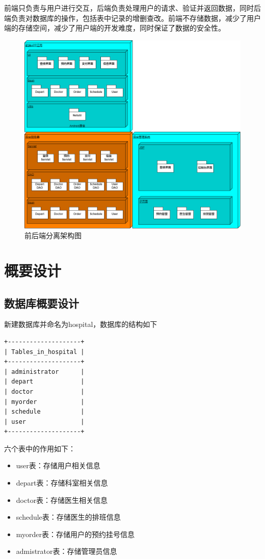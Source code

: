 \documentclass[UTF8,12pt]{article}
\begin{document}
前端只负责与用户进行交互，后端负责处理用户的请求、验证并返回数据，同时后端负责对数据库的操作，包括表中记录的增删查改。前端不存储数据，减少了用户端的存储空间，减少了用户端的开发难度，同时保证了数据的安全性。

\begin{figure}[htbp]
    \centering
    \includegraphics[width=1.0\textwidth]{imgs/15.png}
    \caption{前后端分离架构图}
\end{figure}

\newpage

\section{概要设计}

\subsection{数据库概要设计}
新建数据库并命名为hospital，数据库的结构如下

\begin{lstlisting}[frame=shadowbox]
+--------------------+
| Tables_in_hospital |
+--------------------+
| administrator      |
| depart             |
| doctor             |
| myorder            |
| schedule           |
| user               |
+--------------------+
\end{lstlisting}

六个表中的作用如下：

\begin{itemize}
    \item user表：存储用户相关信息
    \item depart表：存储科室相关信息
    \item doctor表：存储医生相关信息
    \item schedule表：存储医生的排班信息
    \item myorder表：存储用户的预约挂号信息
    \item admistrator表：存储管理员信息
\end{itemize}
\end{document}
